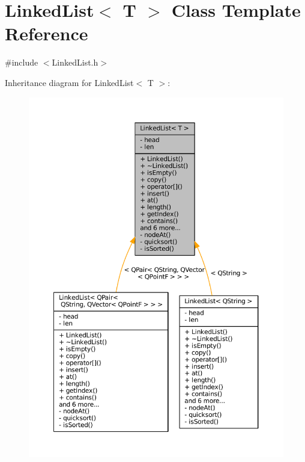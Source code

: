 \hypertarget{classLinkedList}{}\section{Linked\+List$<$ T $>$ Class Template Reference}
\label{classLinkedList}


{\ttfamily \#include $<$Linked\+List.\+h$>$}



Inheritance diagram for Linked\+List$<$ T $>$\+:
\nopagebreak
\begin{figure}[H]
\begin{center}
\leavevmode
\includegraphics[width=350pt]{classLinkedList__inherit__graph}
\end{center}
\end{figure}


